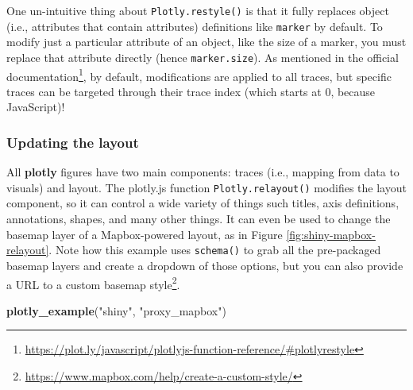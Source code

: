 \documentclass[
  12pt,
]{krantz}
\newenvironment{Shaded}{\begin{snugshade}}{\end{snugshade}}
\newcommand{\KeywordTok}[1]{\textcolor[rgb]{0.13,0.29,0.53}{\textbf{#1}}}
\newcommand{\NormalTok}[1]{#1}
\newcommand{\StringTok}[1]{\textcolor[rgb]{0.31,0.60,0.02}{#1}}
\renewcommand{\href}[2]{#2\footnote{\url{#1}}}
\begin{document}
One un-intuitive thing about \texttt{Plotly.restyle()} is that it fully replaces object (i.e., attributes that contain attributes) definitions like \texttt{marker} by default. To modify just a particular attribute of an object, like the size of a marker, you must replace that attribute directly (hence \texttt{marker.size}). As mentioned in the \href{https://plot.ly/javascript/plotlyjs-function-reference/\#plotlyrestyle}{official documentation}, by default, modifications are applied to all traces, but specific traces can be targeted through their trace index (which starts at 0, because JavaScript)!

\hypertarget{relayout}{%
\subsubsection{Updating the layout}\label{relayout}}

All \textbf{plotly} figures have two main components: traces (i.e., mapping from data to visuals) and layout. The plotly.js function \texttt{Plotly.relayout()} modifies the layout component, so it can control a wide variety of things such titles, axis definitions, annotations, shapes, and many other things. It can even be used to change the basemap layer of a Mapbox-powered layout, as in Figure \ref{fig:shiny-mapbox-relayout}. Note how this example uses \texttt{schema()} to grab all the pre-packaged basemap layers and create a dropdown of those options, but you can also provide a URL to a \href{https://www.mapbox.com/help/create-a-custom-style/}{custom basemap style}.

\begin{Shaded}
\begin{Highlighting}[]
\KeywordTok{plotly_example}\NormalTok{(}\StringTok{"shiny"}\NormalTok{, }\StringTok{"proxy_mapbox"}\NormalTok{)}
\end{Highlighting}
\end{Shaded}
\end{document}

